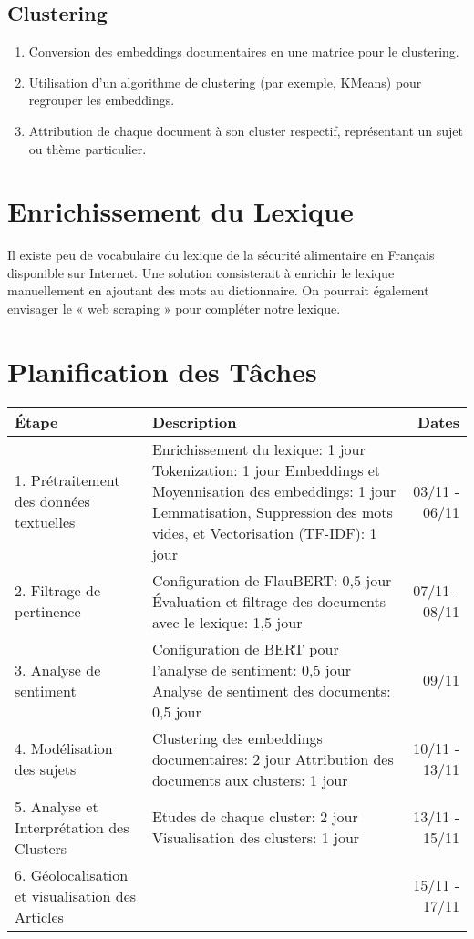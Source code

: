 \documentclass{article}
\begin{document}
\subsection{Clustering}
\begin{enumerate}
  \item Conversion des embeddings documentaires en une matrice pour le clustering.
  \item Utilisation d'un algorithme de clustering (par exemple, KMeans) pour regrouper les embeddings.
  \item Attribution de chaque document à son cluster respectif, représentant un sujet ou thème particulier.
\end{enumerate}


\section*{Enrichissement du Lexique}
Il existe peu de vocabulaire du lexique de la sécurité alimentaire en Français disponible sur Internet. Une solution consisterait à enrichir le lexique manuellement en ajoutant des mots au dictionnaire. On pourrait également envisager le « web scraping » pour compléter notre lexique.


\section*{Planification des Tâches}

\noindent
\begin{tabularx}{\textwidth}{@{}lXr@{}}
\toprule
\textbf{Étape} & \textbf{Description} & \textbf{Dates} \\
\midrule
1. Prétraitement des données textuelles & 
Enrichissement du lexique: 1 jour\newline
Tokenization: 1 jour\newline
Embeddings et Moyennisation des embeddings: 1 jour\newline
Lemmatisation, Suppression des mots vides, et Vectorisation (TF-IDF): 1 jour & 
03/11 - 06/11 \\
\midrule
2. Filtrage de pertinence & 
Configuration de FlauBERT: 0,5 jour\newline
Évaluation et filtrage des documents avec le lexique: 1,5 jour & 
07/11 - 08/11 \\
\midrule
3. Analyse de sentiment & 
Configuration de BERT pour l'analyse de sentiment: 0,5 jour\newline
Analyse de sentiment des documents: 0,5 jour & 
09/11 \\
\midrule
4. Modélisation des sujets & 
Clustering des embeddings documentaires: 2 jour\newline
Attribution des documents aux clusters: 1 jour & 
10/11 - 13/11 \\
\midrule
5. Analyse et Interprétation des Clusters & 
Etudes de chaque cluster: 2 jour\newline
Visualisation des clusters: 1 jour & 
13/11 - 15/11 \\
\midrule
6. Géolocalisation et visualisation des Articles & 
 & 
15/11 - 17/11 \\
\bottomrule
\end{tabularx}
\end{document}
